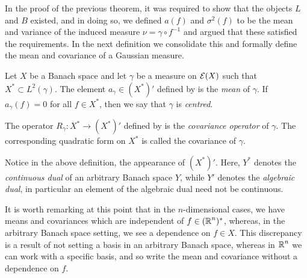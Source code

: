 \documentclass[../main.tex]{subfiles}
\begin{document}
In the proof of the previous theorem, it was required to show that the objects $L$ and $B$ existed, and in doing so, we defined $a(f)$ and $\sigma^2(f)$ to be the mean and variance of the induced measure $\nu = \gamma\circ f^{-1}$ and argued that these satisfied the requirements. In the next definition we consolidate this and formally define the mean and covariance of a Gaussian measure.

\begin{definition}
\label{def:mean_cov_gauss}
Let $X$ be a Banach space and let $\gamma$ be a measure on $\mathcal{E}(X)$ such that $X^*\subset L^2(\gamma)$. The element $a_\gamma\in (X^*)'$ defined by  is the \emph{mean} of $\gamma$. If $a_\gamma(f) = 0$ for all $f\in X^*$, then we say that $\gamma$ is \emph{centred}.

The operator $R_\gamma:X^*\to (X^*)'$ defined by  is the \emph{covariance operator} of $\gamma$. The corresponding quadratic form on $X^*$ is called the covariance of $\gamma$.
\end{definition}

\begin{remark}
Notice in the above definition, the appearance of $(X^*)'$. Here, $Y^*$ denotes the \emph{continuous dual} of an arbitrary Banach space $Y$, while $Y'$ denotes the \emph{algebraic dual}, in particular an element of the algebraic dual need not be continuous.
\end{remark}

It is worth remarking at this point that in the $n$-dimensional cases, we have means and covariances which are independent of $f\in(\operatorname{\mathbb{R}}^n)^*$, whereas, in the arbitrary Banach space setting, we see a dependence on $f\in X$. This discrepancy is a result of not setting a basis in an arbitrary Banach space, whereas in $\operatorname{\mathbb{R}}^n$ we can work with a specific basis, and so write the mean and covariance without a dependence on $f$.
\end{document}
